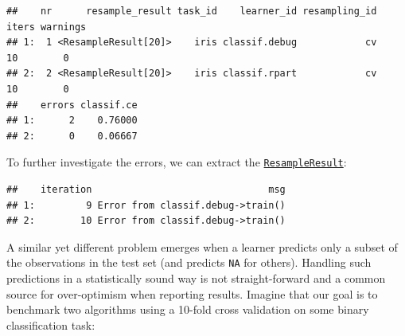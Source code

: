 \documentclass[
]{scrbook}
\newenvironment{Shaded}{\begin{snugshade}}{\end{snugshade}}
\newcommand{\AttributeTok}[1]{\textcolor[rgb]{0.77,0.63,0.00}{#1}}
\newcommand{\ConstantTok}[1]{\textcolor[rgb]{0.00,0.00,0.00}{#1}}
\newcommand{\FloatTok}[1]{\textcolor[rgb]{0.00,0.00,0.81}{#1}}
\newcommand{\FunctionTok}[1]{\textcolor[rgb]{0.00,0.00,0.00}{#1}}
\newcommand{\NormalTok}[1]{#1}
\newcommand{\OtherTok}[1]{\textcolor[rgb]{0.56,0.35,0.01}{#1}}
\newcommand{\SpecialCharTok}[1]{\textcolor[rgb]{0.00,0.00,0.00}{#1}}
\newcommand{\StringTok}[1]{\textcolor[rgb]{0.31,0.60,0.02}{#1}}
\renewenvironment{Shaded} {\begin{snugshade}\small} {\end{snugshade}}
\begin{document}
\begin{Shaded}
\end{Shaded}

\begin{verbatim}
##    nr      resample_result task_id    learner_id resampling_id iters warnings
## 1:  1 <ResampleResult[20]>    iris classif.debug            cv    10        0
## 2:  2 <ResampleResult[20]>    iris classif.rpart            cv    10        0
##    errors classif.ce
## 1:      2    0.76000
## 2:      0    0.06667
\end{verbatim}

To further investigate the errors, we can extract the \href{https://mlr3.mlr-org.com/reference/ResampleResult.html}{\texttt{ResampleResult}}:

\begin{Shaded}
\end{Shaded}

\begin{verbatim}
##    iteration                               msg
## 1:         9 Error from classif.debug->train()
## 2:        10 Error from classif.debug->train()
\end{verbatim}

A similar yet different problem emerges when a learner predicts only a subset of the observations in the test set (and predicts \texttt{NA} for others).
Handling such predictions in a statistically sound way is not straight-forward and a common source for over-optimism when reporting results.
Imagine that our goal is to benchmark two algorithms using a 10-fold cross validation on some binary classification task:
\end{document}
